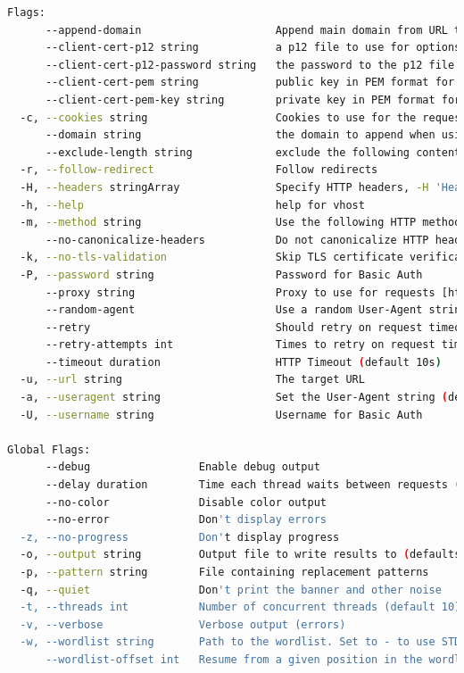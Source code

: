 \documentclass[12 pt]{article}
\begin{document}
\begin{lstlisting}[language=bash]
Flags:
      --append-domain                     Append main domain from URL to words from wordlist. Otherwise the fully qualified domains need to be specified in the wordlist.
      --client-cert-p12 string            a p12 file to use for options TLS client certificates
      --client-cert-p12-password string   the password to the p12 file
      --client-cert-pem string            public key in PEM format for optional TLS client certificates
      --client-cert-pem-key string        private key in PEM format for optional TLS client certificates (this key needs to have no password)
  -c, --cookies string                    Cookies to use for the requests
      --domain string                     the domain to append when using an IP address as URL. If left empty and you specify a domain based URL the hostname from the URL is extracted
      --exclude-length string             exclude the following content lengths (completely ignores the status). You can separate multiple lengths by comma and it also supports ranges like 203-206
  -r, --follow-redirect                   Follow redirects
  -H, --headers stringArray               Specify HTTP headers, -H 'Header1: val1' -H 'Header2: val2'
  -h, --help                              help for vhost
  -m, --method string                     Use the following HTTP method (default "GET")
      --no-canonicalize-headers           Do not canonicalize HTTP header names. If set header names are sent as is.
  -k, --no-tls-validation                 Skip TLS certificate verification
  -P, --password string                   Password for Basic Auth
      --proxy string                      Proxy to use for requests [http(s)://host:port] or [socks5://host:port]
      --random-agent                      Use a random User-Agent string
      --retry                             Should retry on request timeout
      --retry-attempts int                Times to retry on request timeout (default 3)
      --timeout duration                  HTTP Timeout (default 10s)
  -u, --url string                        The target URL
  -a, --useragent string                  Set the User-Agent string (default "gobuster/3.6")
  -U, --username string                   Username for Basic Auth

Global Flags:
      --debug                 Enable debug output
      --delay duration        Time each thread waits between requests (e.g. 1500ms)
      --no-color              Disable color output
      --no-error              Don't display errors
  -z, --no-progress           Don't display progress
  -o, --output string         Output file to write results to (defaults to stdout)
  -p, --pattern string        File containing replacement patterns
  -q, --quiet                 Don't print the banner and other noise
  -t, --threads int           Number of concurrent threads (default 10)
  -v, --verbose               Verbose output (errors)
  -w, --wordlist string       Path to the wordlist. Set to - to use STDIN.
      --wordlist-offset int   Resume from a given position in the wordlist (defaults to 0)
\end{lstlisting}
\end{document}
